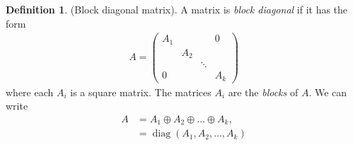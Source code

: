 \documentclass{article}
\theoremstyle{definition} \newtheorem*{definition}{Definition}
\DeclareMathOperator{\diag}{diag}
\begin{document}
\begin{definition}
  (Block diagonal matrix). A matrix is \textit{block diagonal} if it has
  the form
  \begin{align*}
    A = \left( 
    \begin{matrix}
    A_1 & & & 0\\
     & A_2 & &\\
     &&\ddots&\\
     0&&&A_k
    \end{matrix}
    \right)
  \end{align*}
  where each $A_i$ is a square matrix. The matrices $A_i$ are the
  \textit{blocks} of $A$. We can write
  \begin{align*}
    A &= A_1 \oplus A_2 \oplus \dots \oplus A_k,\\
    &= \diag(A_1,A_2,\dots,A_k)
  \end{align*}
\end{definition}
\end{document}

